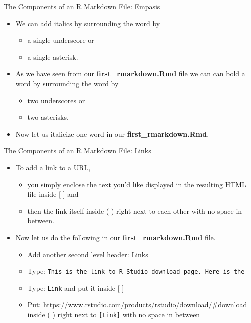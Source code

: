 \documentclass[
  ignorenonframetext,
]{beamer}
\providecommand{\tightlist}{%
  \setlength{\itemsep}{0pt}\setlength{\parskip}{0pt}}
\begin{document}
\begin{frame}{The Components of an R Markdown File: Empasis}
\protect\hypertarget{the-components-of-an-r-markdown-file-empasis}{}
\begin{itemize}
\item
  We can add italics by surrounding the word by

  \begin{itemize}
  \tightlist
  \item
    a single underscore or
  \item
    a single asterisk.
  \end{itemize}
\item
  As we have seen from our \textbf{first\_rmarkdown.Rmd} file we can can
  bold a word by surrounding the word by

  \begin{itemize}
  \tightlist
  \item
    two underscores or
  \item
    two asterisks.
  \end{itemize}
\item
  Now let us italicize one word in our \textbf{first\_rmarkdown.Rmd}.
\end{itemize}
\end{frame}

\begin{frame}[fragile]{The Components of an R Markdown File: Links}
\protect\hypertarget{the-components-of-an-r-markdown-file-links}{}
\begin{itemize}
\item
  To add a link to a URL,

  \begin{itemize}
  \tightlist
  \item
    you simply enclose the text you'd like displayed in the resulting
    HTML file inside {[} {]} and
  \item
    then the link itself inside ( ) right next to each other with no
    space in between.
  \end{itemize}
\item
  Now let us do the following in our \textbf{first\_rmarkdown.Rmd} file.

  \begin{itemize}
  \tightlist
  \item
    Add another second level header: Links
  \item
    Type:
    \texttt{This\ is\ the\ link\ to\ R\ Studio\ download\ page.\ Here\ is\ the}
  \item
    Type: \texttt{Link} and put it inside {[} {]}
  \item
    Put:
    \url{https://www.rstudio.com/products/rstudio/download/\#download}
    inside ( ) right next to \texttt{{[}Link{]}} with no space in
    between
  \end{itemize}
\end{itemize}
\end{frame}
\end{document}
